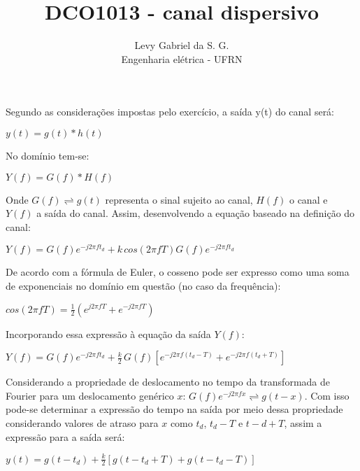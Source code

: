 \title{DCO1013 - canal dispersivo}
\author{Levy Gabriel da S. G. \\ Engenharia elétrica - UFRN}

\maketitle
\thispagestyle{fancy}

Segundo as considerações impostas pelo exercício, a saída y(t) do canal será:

\begin{center}
    $y(t) = g(t) \ast h(t)$
\end{center}

No domínio tem-se:

\begin{center}
    $Y(f) = G(f) \ast H(f)$
\end{center}

Onde $G(f)\rightleftharpoons g(t)$ representa o sinal sujeito ao canal, $H(f)$ o canal e $Y(f)$ a saída do canal. Assim, desenvolvendo a equação baseado na definição do canal:

\begin{center}
    $Y(f) = G(f)e^{-j2\pi f t_d} + k \, cos(2\pi fT) G(f)e^{-j2\pi f t_d}$
\end{center}

De acordo com a fórmula de Euler, o cosseno pode ser expresso como uma soma de exponenciais no domínio em questão (no caso da frequência):

\begin{center}
    $cos(2\pi f T) = \frac{1}{2} (e^{j2\pi f T}   +    e^{-j2\pi f T})$
\end{center}

Incorporando essa expressão à equação da saída $Y(f)$:

\begin{center}
    $Y(f) = G(f)e^{-j2\pi f t_d} + \frac{k}{2} \, G(f)   [e^{-j2\pi f (t_d-T)}   +    e^{-j2\pi f (t_d+T)}]$
\end{center}

Considerando a propriedade de deslocamento no tempo da transformada de Fourier para um deslocamento genérico $x$: $G(f)e^{-j2\pi f x} \rightleftharpoons g(t-x)$. Com isso pode-se determinar a expressão do tempo na saída por meio dessa propriedade considerando valores de atraso para $x$ como $t_d$, $t_d-T$ e $t-d+T$, assim a expressão para a saída será:

\begin{center}
    $y(t) = g(t-t_d) + \frac{k}{2} [g(t-t_d+T) + g(t-t_d-T)]$
\end{center}

